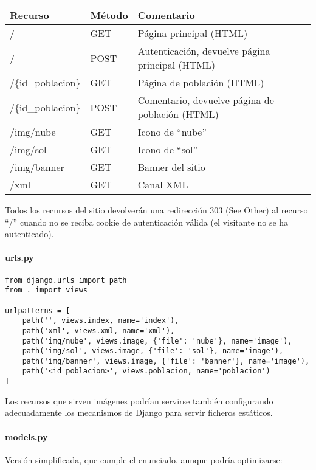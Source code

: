 \begin{tabular}{|l|l|l|}
  \hline
  Recurso & Método & Comentario \\ \hline \hline
  /       & GET    & Página principal (HTML) \\ \hline
  /       & POST    & Autenticación, devuelve página principal (HTML) \\ \hline
  /\{id\_poblacion\} & GET   & Página de población (HTML) \\ \hline
  /\{id\_poblacion\} & POST   & Comentario, devuelve página de población (HTML) \\ \hline
  /img/nube & GET & Icono de ``nube'' \\ \hline
  /img/sol & GET & Icono de ``sol'' \\ \hline
  /img/banner & GET & Banner del sitio \\ \hline
  /xml & GET & Canal XML \\ \hline
\end{tabular}

Todos los recursos del sitio devolverán una redirección 303 (See Other) al recurso ``/'' cuando no se reciba cookie de autenticación válida (el visitante no se ha autenticado).


\paragraph{urls.py}


\begin{verbatim}
from django.urls import path
from . import views

urlpatterns = [
    path('', views.index, name='index'),
    path('xml', views.xml, name='xml'),
    path('img/nube', views.image, {'file': 'nube'}, name='image'),
    path('img/sol', views.image, {'file': 'sol'}, name='image'),
    path('img/banner', views.image, {'file': 'banner'}, name='image'),
    path('<id_poblacion>', views.poblacion, name='poblacion')
]
\end{verbatim}

Los recursos que sirven imágenes podrían servirse también configurando
adecuadamente los mecanismos de Django para servir ficheros estáticos.

\paragraph{models.py}

Versión simplificada, que cumple el enunciado, aunque podría optimizarse:

